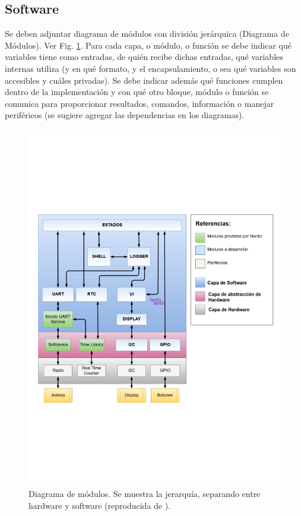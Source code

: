 \documentclass[a4paper,12pt]{article}
\begin{document}
\begin{linenumbers}
\subsection{Software}
\label{sec:software}


Se deben adjuntar diagrama de módulos con división jer\'arquica (Diagrama de Módulos). Ver Fig. \ref{fig:insulogger}. Para cada capa, o m\'odulo, o funci\'on se debe indicar qué variables tiene como entradas, de qui\'en recibe dichas entradas, qué variables internas utiliza (y en qué formato, y el encapsulamiento, o sea qué variables son accesibles y cuáles privadas). Se debe indicar adem\'as qué funciones cumplen dentro de la implementaci\'on y con qué otro bloque,  m\'odulo o funci\'on se comunica  para proporcionar resultados, comandos, informaci\'on o manejar perif\'ericos (se sugiere agregar las dependencias en los diagramas). 

\begin{figure}[ht]
  \begin{center}
    \includegraphics[width=\textwidth]{insulogger.pdf}
  \end{center}
  \caption{Diagrama de módulos. Se muestra la jerarqu\'ia, separando entre hardware y software (reproducida de \cite{Bentancour2018}). }
  \label{fig:insulogger}
\end{figure}


\end{linenumbers}
\end{document}
